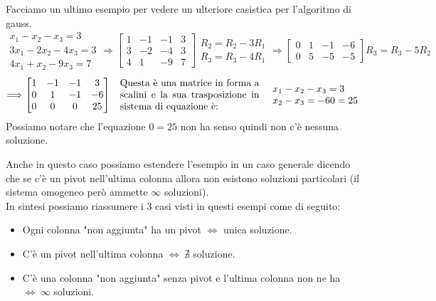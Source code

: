 \begin{example}
Facciamo un ultimo esempio per vedere un ulteriore casistica per l'algoritmo di gauss.
\[
    \begin{array}{l}
    x_1 - x_2 - x_3 = 3\\
    3x_1 - 2 x_2 - 4x_3 = 3\\
    4x_1 + x_2 - 9x_3 = 7
    \end{array}
    \Longrightarrow
    \begin{bmatrix}
    1 & -1 & -1 & 3\\
    3 & -2 & -4 & 3\\
    4 & 1 & -9 & 7
    \end{bmatrix}
    \begin{array}{r}
    R_2 = R_2 - 3R_1\\
    R_3 = R_3 - 4R_1
    \end{array}
    \Longrightarrow
    \begin{bmatrix}
    0 & 1 & -1 & -6\\
    0 & 5 & -5 & -5
    \end{bmatrix}
    R_3 = R_3 -5R_2
\]
\[
    \Longrightarrow
    \begin{bmatrix}
    1 & -1 & -1 & 3\\
    0 & 1 & -1 & -6\\
    0 & 0 & 0 & 25
    \end{bmatrix}
    \hspace{.3cm}
    \parbox{5cm}{Questa è una matrice in forma a scalini e la sua trasposizione in sistema di equazione è:}
    \hspace{.3cm}
    \begin{array}{l}
    x_1 - x_2 - x_3 = 3\\
    x_2 - x_3 = -6
    0 = 25
    \end{array}
\]
Possiamo notare che l'equazione $0=25$ non ha senso quindi non c'è nessuna soluzione.
\end{example}
\hspace{-15pt}Anche in questo caso possiamo estendere l'esempio in un caso generale dicendo che se c'è un pivot nell'ultima colonna allora non esistono soluzioni particolari (il sistema omogeneo però ammette $\infty$ soluzioni).\\
In sintesi possiamo riassumere i 3 casi visti in questi esempi come di seguito:
\begin{itemize}
    \item Ogni colonna "non aggiunta" ha un pivot $\Longleftrightarrow$ unica soluzione.
    \item C'è un pivot nell'ultima colonna $\Longleftrightarrow \: \nexists$ soluzione.
    \item C'è una colonna "non aggiunta" senza pivot e l'ultima colonna non ne ha $\Longleftrightarrow \: \infty$ soluzioni.
\end{itemize}

